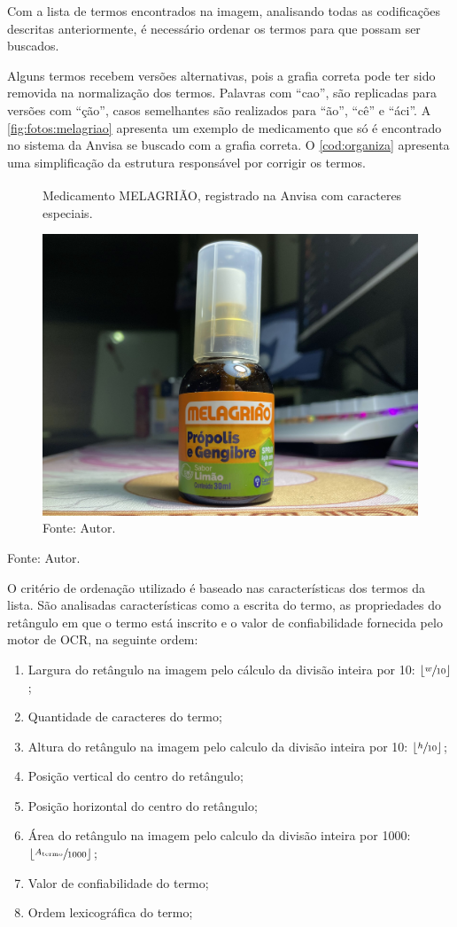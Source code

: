 Com a lista de termos encontrados na imagem, analisando todas as codificações descritas anteriormente, é necessário ordenar os termos para que possam ser buscados.

Alguns termos recebem versões alternativas, pois a grafia correta pode ter sido removida na normalização dos termos.
Palavras com ``cao'', são replicadas para versões com ``ção'', casos semelhantes são realizados para ``ão'', ``cê'' e ``áci''.
A \autoref{fig:fotos:melagriao} apresenta um exemplo de medicamento que só é encontrado no sistema da \ac{Anvisa} se buscado com a grafia correta.
O \autoref{cod:organiza} apresenta uma simplificação da estrutura responsável por corrigir os termos.

\begin{figure}[htb]
    \centering
    \caption{Medicamento MELAGRIÃO\textsuperscript{\tiny\textregistered}, registrado na \ac{Anvisa} com caracteres especiais.}
    \label{fig:fotos:melagriao}
    \includegraphics[width=0.45\linewidth]{../pictures/melagriao.jpg}
    \caption*{Fonte: Autor.}
\end{figure}


\begin{lstfloat}[htbp]
    \centering
    
    \caption*{Fonte: Autor.}
\end{lstfloat}

O critério de ordenação utilizado é baseado nas características dos termos da lista.
São analisadas características como a escrita do termo, as propriedades do retângulo em que o termo está inscrito e o valor de confiabilidade fornecida pelo motor de \ac{OCR}, na seguinte ordem:
\begin{enumerate}
    \item Largura do retângulo na imagem pelo cálculo da divisão inteira por 10: $\left\lfloor \sfrac{w}{10} \right\rfloor$;
    \item Quantidade de caracteres do termo;
    \item Altura do retângulo na imagem pelo calculo da divisão inteira por 10: $\left\lfloor \sfrac{h}{10} \right\rfloor$;
    \item Posição vertical do centro do retângulo;
    \item Posição horizontal do centro do retângulo;
    \item Área do retângulo  na imagem pelo calculo da divisão inteira por 1000: $\left\lfloor \sfrac{A_{\text{termo}}}{1000} \right\rfloor$;
    \item Valor de confiabilidade do termo;
    \item Ordem lexicográfica do termo;
\end{enumerate}

